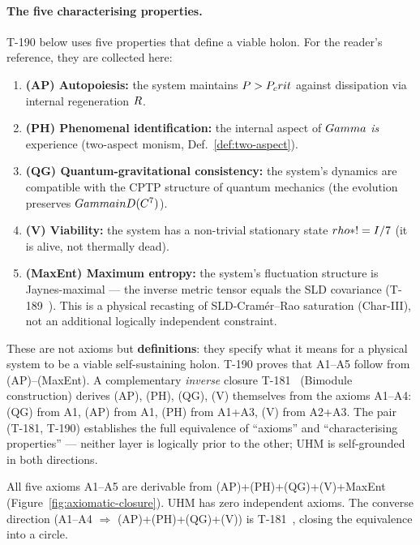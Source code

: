 \paragraph{The five characterising properties.}
T-190 below uses five properties that define a viable holon. For the
reader's reference, they are collected here:

\begin{defbox}
\label{def:five-properties}
\begin{enumerate}[leftmargin=2em,nosep]
  \item \textbf{(AP) Autopoiesis:} the system maintains $P > P_crit$
        against dissipation via internal regeneration $R$.
  \item \textbf{(PH) Phenomenal identification:} the internal aspect
        of $Gamma$ \emph{is} experience (two-aspect monism,
        Def.~\ref{def:two-aspect}).
  \item \textbf{(QG) Quantum-gravitational consistency:} the system's
        dynamics are compatible with the CPTP structure of quantum
        mechanics (the evolution preserves $Gamma in D(C^7)$).
  \item \textbf{(V) Viability:} the system has a non-trivial stationary
        state $rho* != I/7$ (it is alive, not thermally dead).
  \item \textbf{(MaxEnt) Maximum entropy:} the system's fluctuation
        structure is Jaynes-maximal --- the inverse metric tensor equals
        the SLD covariance (T-189~). This is a physical
        recasting of SLD-Cram\'er--Rao saturation (Char-III), not an
        additional logically independent constraint.
\end{enumerate}
These are not axioms but \textbf{definitions}: they specify what it
means for a physical system to be a viable self-sustaining holon. T-190
proves that A1--A5 follow from (AP)--(MaxEnt). A complementary
\emph{inverse} closure T-181~ (Bimodule construction) derives
(AP), (PH), (QG), (V) themselves from the axioms A1--A4: (QG) from A1,
(AP) from A1, (PH) from A1+A3, (V) from A2+A3. The pair (T-181, T-190)
establishes the full equivalence of ``axioms'' and ``characterising
properties'' --- neither layer is logically prior to the other; UHM is
self-grounded in both directions.
\end{defbox}

\begin{theorembox}
\label{thm:t190-closure}
All five axioms A1--A5 are derivable from (AP)+(PH)+(QG)+(V)+MaxEnt
(Figure~\ref{fig:axiomatic-closure}). UHM has zero independent axioms.
The converse direction (A1--A4 $\Rightarrow$ (AP)+(PH)+(QG)+(V)) is
T-181~, closing the equivalence into a circle.
\end{theorembox}


